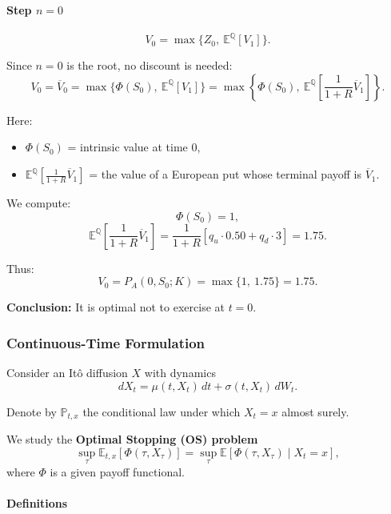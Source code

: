 \documentclass[12pt,a4paper]{article}
\theoremstyle{definition}
\newcommand{\Prob}{\mathbb{P}}
\begin{document}
\paragraph{Step $n = 0$}

\[
V_0 = \max\{Z_0, \ \mathbb{E}^{\mathbb{Q}}[V_1]\}.
\]

Since $n = 0$ is the root, no discount is needed:
\[
V_0 = \overline{V}_0 = \max\{\Phi(S_0), \ \mathbb{E}^{\mathbb{Q}}[V_1]\} = \max\left\{\Phi(S_0), \ \mathbb{E}^{\mathbb{Q}}\!\left[\frac{1}{1+R} \overline{V}_1\right]\right\}.
\]

Here:
\begin{itemize}
\item $\Phi(S_0)$ = intrinsic value at time $0$,
\item $\mathbb{E}^{\mathbb{Q}}\left[\frac{1}{1+R} \overline{V}_1\right]$ = the value of a European put whose terminal payoff is $\overline{V}_1$.
\end{itemize}

We compute:
\[
\Phi(S_0) = 1,
\]
\[
\mathbb{E}^{\mathbb{Q}}\!\left[\frac{1}{1+R} \overline{V}_1\right] = \frac{1}{1+R} [q_u \cdot 0.50 + q_d \cdot 3] = 1.75.
\]

Thus:
\[
V_0 = P_A(0, S_0; K) = \max\{1, \ 1.75\} = 1.75.
\]

\textbf{Conclusion:} It is optimal not to exercise at $t = 0$.

\subsubsection{Continuous-Time Formulation}

Consider an Itô diffusion $X$ with dynamics
\[
dX_t = \mu(t, X_t) \, dt + \sigma(t, X_t) \, dW_t.
\]

Denote by $\Prob_{t,x}$ the conditional law under which $X_t = x$ almost surely.

We study the \textbf{Optimal Stopping (OS) problem}
\[
\sup_{\tau} \mathbb{E}_{t,x}\![{\Phi(\tau, X_\tau)}] = \sup_{\tau} \mathbb{E}[\Phi(\tau, X_\tau) \mid X_t = x],
\]
where $\Phi$ is a given payoff functional.

\paragraph{Definitions}
\end{document}
